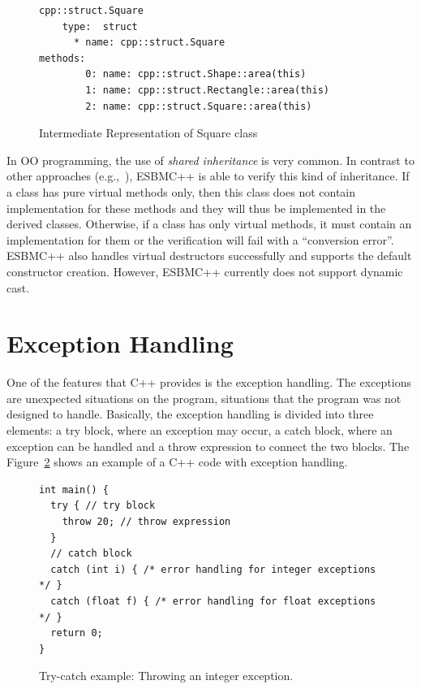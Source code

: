 \documentclass[a4paper]{llncs}
\begin{document}
\begin{figure}[h]
\centering
\begin{minipage}{0.9\textwidth}
\begin{lstlisting}[style=nonumbers]
cpp::struct.Square
    type:  struct
      * name: cpp::struct.Square
methods:
        0: name: cpp::struct.Shape::area(this)
        1: name: cpp::struct.Rectangle::area(this)
        2: name: cpp::struct.Square::area(this)
\end{lstlisting}
\end{minipage}
\caption{Intermediate Representation of Square class}
\label{figure:IR_uml_square}
\end{figure}

In OO programming, the use of \textit{shared inheritance} is very common.
In contrast to other approaches (e.g.,~\cite{Blanc07}), ESBMC++ is able to
verify this kind of inheritance. If a class has pure virtual methods only,
then this class does not contain implementation for these methods and they will
thus be implemented in the derived classes. Otherwise, if a class has only virtual
methods, it must contain an implementation for them or the verification will fail
with a ``conversion error''. ESBMC++ also handles  virtual destructors successfully
and supports the default constructor creation. However, ESBMC++ currently does not
support dynamic cast.

\section{Exception Handling}

One of the features that C++ provides is the exception handling. The exceptions are unexpected situations on the program, situations
that the program was not designed to handle. Basically, the exception handling is divided into three elements: a try block, where an
exception may occur, a catch block, where an exception can be handled and a throw expression to connect the two blocks. The
Figure~\ref{figure:try-catch-example} shows an example of a C++ code with exception handling.

\begin{figure}[ht]
\centering
\begin{minipage}{1.0\textwidth}
\begin{lstlisting}
int main() {
  try { // try block
    throw 20; // throw expression
  }
  // catch block
  catch (int i) { /* error handling for integer exceptions */ }
  catch (float f) { /* error handling for float exceptions */ }
  return 0;
}
\end{lstlisting}
\end{minipage}
\caption{Try-catch example: Throwing an integer exception.}
\label{figure:try-catch-example}
\end{figure}
\end{document}
